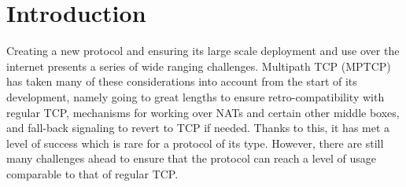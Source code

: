 \documentclass[12pt, a4paper, oneside]{article} %
\begin{document}

\pagestyle{fancy} %




%
%
%





\section{Introduction}
Creating a new protocol and ensuring its large scale deployment and use over the internet presents a series of wide ranging challenges. Multipath TCP (MPTCP) has taken many of these considerations into account from the start of its development, namely going to great lengths to ensure retro-compatibility with regular TCP, mechanisms for working over NATs and certain other middle boxes, and fall-back signaling to revert to TCP if needed. Thanks to this, it has met a level of success which is rare for a protocol of its type. However, there are still many challenges ahead to ensure that the protocol can reach a level of usage comparable to that of regular TCP. \\
\end{document}
